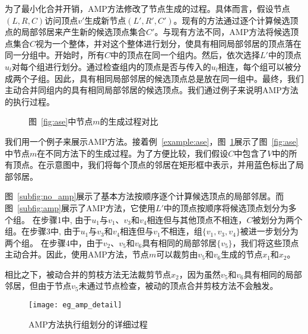 为了最小化合并开销，AMP方法修改了节点生成的过程。具体而言，假设节点$(L,R,C)$访问顶点$v'$生成新节点$(L',R',C')$。现有的方法通过逐个计算候选顶点的局部邻居来产生新的候选顶点集合$C'$。与现有方法不同，AMP方法将候选顶点集合$C$视为一个整体，并对这个整体进行划分，使具有相同局部邻居的顶点落在同一分组中。开始时，所有$C$中的顶点在同一个组内。然后，依次选择$L'$中的顶点$u_l$对每个组进行划分。通过检查组内的顶点是否与传入的$u_l$相连，每个组可以被分成两个子组。因此，具有相同局部邻居的候选顶点总是放在同一组中。最终，我们主动合并同组内的具有相同局部邻居的候选顶点。我们通过例子来说明AMP方法的执行过程。


\begin{figure} 
	\centering
	
	 \quad

	\caption{图~\ref{fig:ase}中节点$m$的生成过程对比}
	\label{fig:amp}

\end{figure}

\begin{example}
  我们用一个例子来展示AMP方法。接着例~\ref{example:ase}，图~\ref{fig:amp}展示了图~\ref{fig:ase}中节点$m$在不同方法下的生成过程。为了方便比较，我们假设$C$中包含了$V$中的所有顶点。在示意图中，我们将每个顶点的邻居在矩形框中表示，并用蓝色标出了局部邻居。

  图~\ref{subfig:no_amp}展示了基本方法按顺序逐个计算候选顶点的局部邻居。而图~\ref{subfig:amp}展示了AMP方法，它使用$L'$中的顶点按顺序将候选顶点划分为多个组。  在步骤\Num1中, 由于$u_1$与$v_1$、$v_3$和$v_4$相连但与其他顶点不相连，$C$被划分为两个组。在步骤\Num3中, 由于$u_1$与$v_3$和$v_4$相连但与$v_1$不相连，组$\{v_1, v_3, v_4\}$被进一步划分为两个组。
在步骤\Num4中，由于$v_2$、$v_5$和$v_6$具有相同的局部邻居$\{v_5\}$，我们将这些顶点主动合并。因此，使用AMP方法，节点$m$可以裁剪由$v_5$和$v_6$生成的节点$x_1$和$x_2$。

相比之下，被动合并的剪枝方法无法裁剪节点$x_2$，因为虽然$v_5$和$v_6$具有相同的局部邻居，但由于节点$v_5$未通过节点检查，被动的顶点合并剪枝方法不会触发。

\label{example:amp}
\end{example}

\begin{figure} 
	\centering
	
  \texttt{[image: eg\_amp\_detail]}

	\caption{AMP方法执行组划分的详细过程}
	\label{fig:amp_detail}

\end{figure}

